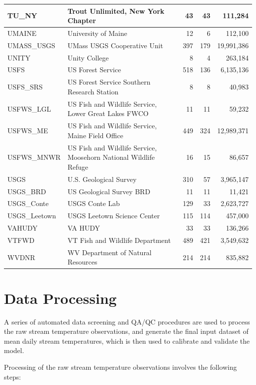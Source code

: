 \documentclass[]{book}
\begin{document}
\begin{tabular}{l|l|r|r|r}
\hline
TU\_NY & Trout Unlimited, New York Chapter & 43 & 43 & 111,284\\
\hline
UMAINE & University of Maine & 12 & 6 & 112,100\\
\hline
UMASS\_USGS & UMass USGS Cooperative Unit & 397 & 179 & 19,991,386\\
\hline
UNITY & Unity College & 8 & 4 & 263,184\\
\hline
USFS & US Forest Service & 518 & 136 & 6,135,136\\
\hline
USFS\_SRS & US Forest Service Southern Research Station & 8 & 8 & 40,983\\
\hline
USFWS\_LGL & US Fish and Wildlife Service, Lower Great Lakes FWCO & 11 & 11 & 59,232\\
\hline
USFWS\_ME & US Fish and Wildlife Service, Maine Field Office & 449 & 324 & 12,989,371\\
\hline
USFWS\_MNWR & US Fish and Wildlife Service, Moosehorn National Wildlife Refuge & 16 & 15 & 86,657\\
\hline
USGS & U.S. Geological Survey & 310 & 57 & 3,965,147\\
\hline
USGS\_BRD & US Geological Survey BRD & 11 & 11 & 11,421\\
\hline
USGS\_Conte & USGS Conte Lab & 129 & 33 & 2,623,727\\
\hline
USGS\_Leetown & USGS Leetown Science Center & 115 & 114 & 457,000\\
\hline
VAHUDY & VA HUDY & 33 & 33 & 136,266\\
\hline
VTFWD & VT Fish and Wildlife Department & 489 & 421 & 3,549,632\\
\hline
WVDNR & WV Department of Natural Resources & 214 & 214 & 835,882\\
\hline
\end{tabular}

\hypertarget{data-processing}{%
\chapter{Data Processing}\label{data-processing}}

A series of automated data screening and QA/QC procedures are used to process the raw stream temperature observations, and generate the final input dataset of mean daily stream temperatures, which is then used to calibrate and validate the model.

Processing of the raw stream temperature observations involves the following steps:
\end{document}
